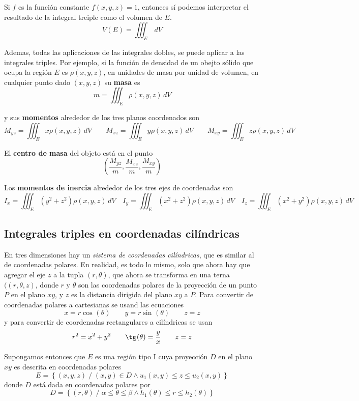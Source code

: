 \documentclass[12pt]{article}
\begin{document}
Si $ f $ es la función constante $ f(x,y,z)=1 $, entonces sí podemos interpretar el resultado de la integral treiple como el volumen de $ E $.
\[
  V(E)=\iiint_{E}  \,dV
\]

Ademas, todas las aplicaciones de las integrales dobles, se puede aplicar a las integrales triples. Por ejemplo, si la función de densidad de un obejto sólido que ocupa la región $ E $ es $ \rho(x,y,z) $, en unidades de masa por unidad de volumen, en cualquier punto dado $ (x,y,z) $ su \textbf{masa} es
\[
  m=\iiint_{E} \rho(x,y,z) \,dV
\]

y sus \textbf{momentos} alrededor de los tres planos coordenados son
\[
  M_{yz}=\iiint_{E} x\rho(x,y,z) \,dV \qquad M_{xz}=\iiint_{E} y\rho(x,y,z) \,dV \qquad M_{xy}=\iiint_{E} z\rho(x,y,z) \,dV
\]

El \textbf{centro de masa} del objeto está en el punto 
\[
  \left(\frac{M_{yz}}{m},\frac{M_{xz}}{m},\frac{M_{xy}}{m}\right)
\]

Los \textbf{momentos de inercia} alrededor de los tres ejes de coordenadas son
\[
  I_{x}=\iiint_{E} (y^2+z^2)\rho(x,y,z) \,dV \quad I_{y}=\iiint_{E} (x^2+z^2)\rho(x,y,z) \,dV \quad I_{z}=\iiint_{E} (x^2+y^2)\rho(x,y,z) \,dV
\]

\subsection{Integrales triples en coordenadas cilíndricas}
En tres dimensiones hay un \textit{sistema de coordenadas cilíndricas}, que es similar al de coordenadas polares. En realidad, es todo lo mismo, solo que ahora hay que agregar el eje $ z $ a la tupla $ (r,\theta) $, que ahora se transforma en una terna $ ((r,\theta,z) $, donde $ r $ y $ \theta $ son las coordenadas polares de la proyección de un punto $ P $ en el plano $ xy $, y $ z $ es la distancia dirigida del plano $ xy $ a $ P $. Para convertir de coordenadas polares a cartesianas se usand las ecuaciones
\[
  x=r\cos^{}(\theta)\qquad y=r\sin^{}(\theta) \qquad z=z
\]
y para convertir de coordenadas rectangulares a cilíndricas se usan
\[
  r^2=x^2+y^2 \qquad \tg^{}(\theta)=\frac{y}{x}\qquad z=z
\]

Supongamos entonces que $ E $ es una región tipo I cuya proyección $ D $ en el plano $ xy $ es descrita en coordenadas polares
\[
  E=\left\{(x,y,z) \;/\; (x,y) \in D \land u_{1}(x,y)\leq z\leq u_{2}(x,y)\right\}
\]
donde $ D $ está dada en coordenadas polares por 
\[
  D=\left\{(r,\theta) \;/\; \alpha\leq \theta\leq \beta \land h_{1}(\theta)\leq r\leq h_{2}(\theta)\right\}
\]
\end{document}
